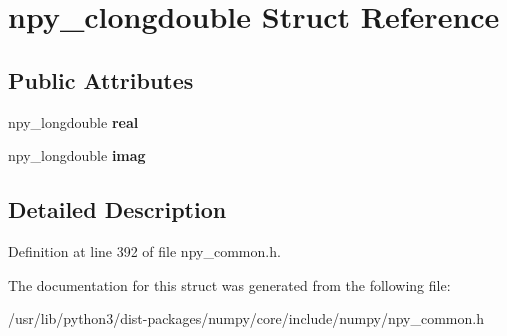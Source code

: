 \hypertarget{structnpy__clongdouble}{}\section{npy\+\_\+clongdouble Struct Reference}
\label{structnpy__clongdouble}
\subsection*{Public Attributes}
\begin{DoxyCompactItemize}
\item 
npy\+\_\+longdouble {\bfseries real}\hypertarget{structnpy__clongdouble_a0c1428764f767854aa68b3f5869929b4}{}\label{structnpy__clongdouble_a0c1428764f767854aa68b3f5869929b4}

\item 
npy\+\_\+longdouble {\bfseries imag}\hypertarget{structnpy__clongdouble_aca26f55b28c2c86f9e1edffe169a30af}{}\label{structnpy__clongdouble_aca26f55b28c2c86f9e1edffe169a30af}

\end{DoxyCompactItemize}


\subsection{Detailed Description}


Definition at line 392 of file npy\+\_\+common.\+h.



The documentation for this struct was generated from the following file\+:\begin{DoxyCompactItemize}
\item 
/usr/lib/python3/dist-\/packages/numpy/core/include/numpy/npy\+\_\+common.\+h\end{DoxyCompactItemize}
